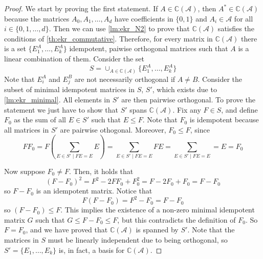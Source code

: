 \documentclass[a4paper,12pt]{article}
\theoremstyle{plain}
\theoremstyle{definition}
\theoremstyle{remark}
\begin{document}
\begin{proof}
    We start by proving the first statement. If $ A \in \mathbb{C}(\mathcal{A}) $,
    then $ A^* \in \mathbb{C}(\mathcal{A}) $ because the matrices
    $ A_0, A_1, \dots, A_d $ have coefficients in $ \{ 0,1 \} $ and
    $ A_i \in \mathcal{A} $ for all $ i \in \{ 0,1,\dots,d \} $. Then we
    can use \ref{lm:ekr_N2} to prove that $ \mathbb{C}(\mathcal{A}) $ satisfies
    the conditions of \ref{th:ekr_commutative}. Therefore, for every matrix
    in $ \mathbb{C}(\mathcal{A}) $ there is a set $ \{ E_1^A, \dots, E_k^A \} $
    idempotent, paiwise orthogonal matrices such that $ A $ is a linear combination
    of them. Consider the set
    \[ S = \cup_{A \in \mathbb{C}(\mathcal{A})} \{ E_1^A, \dots, E_k^A \} \]
    Note that $ E_i^A $ and $ E_j^B $ are not necessarily orthogonal if
    $ A \neq B $. Consider the subset of minimal idempotent matrices in $ S $,
    $ S' $, which exists due to \ref{lm:ekr_minimal}. All elements in $ S' $
    are then pairwise orthogonal. To prove the statement we just have to show
    that $ S' $ spans $ \mathbb{C}(\mathcal{A}) $. Fix any $ F \in S $, and
    define $ F_0 $ as the sum of all $ E \in S' $ such that $ E \leq F $.
    Note that $ F_0 $ is idempotent because all matrices in $ S' $ are pairwise
    othogonal. Moreover, $ F_0 \leq F $, since
    \[ FF_0 = F(\sum_{E \in S' \mid FE = E} E) =
        \sum_{E \in S' \mid FE = E } FE =
    \sum_{E \in S' \mid FE = E } = E = F_0 \]

    Now suppose $ F_0 \neq F $. Then, it holds that
    \[ (F-F_0)^2 = F^2 - 2FF_0 + F_0^2 = F -2F_0 + F_0 = F - F_0  \]
    so $ F - F_0 $ is an idempotent matrix. Notice that
    \[ F(F-F_0) = F^2 -F_0 = F-F_0 \]
    so $ (F-F_0) \leq F $. This implies the existence of a non-zero
    minimal idempotent matrix $ G $ such that $ G \leq F-F_0 \leq F $, but
    this contradicts the definition of $ F_0 $. So $ F = F_0 $, and we have
    proved that $ \mathbb{C}(\mathcal{A}) $ is spanned by $ S' $. Note that
    the matrices in $ S $ must be linearly independent due to being orthogonal,
    so $ S' = \{ E_1, \dots, E_k \} $ is, in fact, a basis for
    $ \mathbb{C}(\mathcal{A}) $.


\end{proof}
\end{document}
